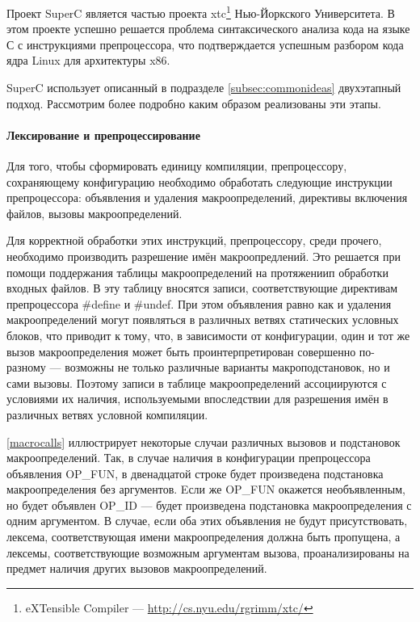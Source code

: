 Проект SuperC является частью проекта xtc\footnote{eXTensible Compiler --- \url{http://cs.nyu.edu/rgrimm/xtc/}} Нью-Йоркского Университета. В этом проекте успешно решается проблема синтаксического анализа кода на языке С с инструкциями препроцессора, что подтверждается успешным разбором кода ядра Linux для архитектуры x86.

SuperC использует описанный в подразделе \ref{subsec:commonideas} двухэтапный подход. Рассмотрим более подробно каким образом реализованы эти этапы.

\paragraph{Лексирование и препроцессирование}
\label{lexingandpreprocessing}

Для того, чтобы сформировать единицу компиляции, препроцессору, сохраняющему конфигурацию необходимо обработать следующие инструкции препроцессора: объявления и удаления макроопределений, директивы включения файлов, вызовы макроопределений.

Для корректной обработки этих инструкций, препроцессору, среди прочего, необходимо производить разрешение имён макроопредлений. Это решается при помощи поддержания таблицы макроопределений на протяжениип обработки входных файлов. В эту таблицу вносятся записи, соответствующие директивам препроцессора \#define и \#undef. При этом объявления равно как и удаления макроопределений могут появляться в различных ветвях статических условных блоков, что приводит к тому, что, в зависимости от конфигурации, один и тот же вызов макроопределения может быть проинтерпретирован совершенно по-разному --- возможны не только различные варианты макроподстановок, но и сами вызовы. Поэтому записи в таблице макроопределений ассоциируются с условиями их наличия, используемыми впоследствии для разрешения имён в различных ветвях условной компиляции.

\autoref{macrocalls} иллюстрирует некоторые случаи различных вызовов и подстановок макроопределений. Так, в случае наличия в конфигурации препроцессора объявления OP\_FUN, в двенадцатой строке будет произведена подстановка макроопределения без аргументов. Eсли же OP\_FUN окажется необъявленным, но будет объявлен OP\_ID --- будет произведена подстановка макроопределения с одним аргументом. В случае, если оба этих объявления не будут присутствовать, лексема, соответствующая имени макроопределения должна быть пропущена, а лексемы, соответствующие возможным аргументам вызова, проанализированы на предмет наличия других вызовов макроопределений.

